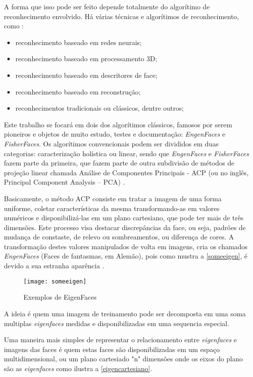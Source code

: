 A forma que isso pode ser feito depende totalmente do algorítimo de reconhecimento envolvido. Há várias técnicas e algorítimos de reconhecimento, como \cite{issues_methods_FR}:

\begin{itemize}
	\item reconhecimento baseado em redes neurais;
	\item reconhecimento baseado em processamento 3D;
	\item reconhecimento baseado em descritores de face;
	\item reconhecimento baseado em reconstrução;
	\item reconhecimentos tradicionais ou clássicos, dentre outros;
\end{itemize}

Este trabalho se focará em dois dos algorítimos clássicos, famosos por serem pioneiros e objetos de muito estudo, testes e documentação: \textit{EngenFaces} e \textit{FisherFaces}. Os algorítimos convencionais podem ser divididos em duas categorias: caracterização holística ou linear, sendo que \textit{EngenFaces} e \textit{FisherFaces} fazem parte da primeira, que fazem parte de outra subdivisão de métodos de projeção linear chamada Análise de Componentes Principais - ACP (ou no inglês, Principal Component Analysis – PCA) \cite{issues_methods_FR}.

Basicamente, o método ACP consiste em tratar a imagem de uma forma uniforme, coletar características da mesma transformando-as em valores numéricos e disponibilizá-las em um plano cartesiano, que pode ter mais de três dimensões. Este processo visa destacar discrepâncias da face, ou seja, padrões de mudança de constaste, de relevo ou sombreamentos, ou diferença de cores. A transformação destes valores manipulados de volta em imagens, cria os chamados \textit{EngenFaces} (Faces de fantasmas, em Alemão), pois como mustra a \autoref{someeigen}, é devido a sua estranha aparência \cite{drmathew_java_programming}.

\begin{figure}[h]
	\centering
	\texttt{[image: someeigen]}
	\caption{Exemplos de EigenFaces}
	\label{someeigen}
\end{figure}

A ideia é quem uma imagem de treinamento pode ser decomposta em uma soma multiplas \textit{eigenfaces} medidas e disponibilizadas em uma sequencia especial.

Uma maneira mais simples de representar o relacionamento entre \textit{eigenfaces} e imagens das faces é quem estas faces são disponibilizadas em um espaço multidimensional, ou um plano cartesiado "n" dimensões onde os eixos do plano são as \textit{eigenfaces} \cite{drmathew_java_programming} como ilustra a  \autoref{eigencartesiano}.

